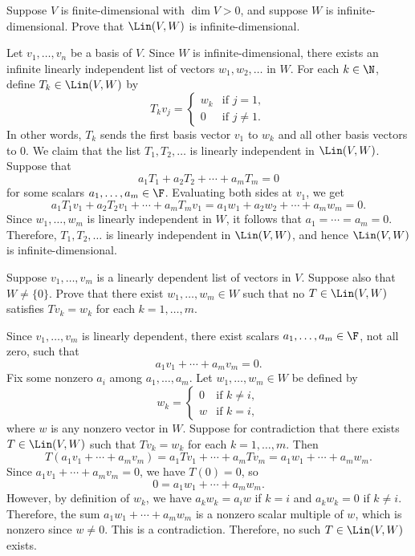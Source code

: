 \begin{exc}
\begin{exercise}
Suppose $V$ is finite-dimensional with $\dim V>0$, and suppose $W$ is
infinite-dimensional. Prove that $\Lin(V,W)$ is infinite-dimensional.
\end{exercise}
\begin{solution}
Let $v_1,\dots,v_n$ be a basis of $V$. Since $W$ is infinite-dimensional,
there exists an infinite linearly independent list of vectors
$w_1,w_2,\dots$ in $W$. For each $k\in\N$, define $T_k\in\Lin(V,W)$ by
\[ T_kv_j=\begin{cases} w_k & \text{if } j=1,\\
   0 & \text{if } j\ne1. \end{cases} \]
In other words, $T_k$ sends the first basis vector $v_1$ to $w_k$ and all
other basis vectors to $0$. We claim that the list $T_1,T_2,\dots$ is linearly
independent in $\Lin(V,W)$. Suppose that
\[ a_1T_1+a_2T_2+\cdots+a_mT_m=0 \]
for some scalars $a_1,\dots,a_m\in\F$. Evaluating both sides at $v_1$, we get
\[ a_1T_1v_1+a_2T_2v_1+\cdots+a_mT_mv_1=a_1w_1+a_2w_2+\cdots+a_mw_m=0. \]
Since $w_1,\dots,w_m$ is linearly independent in $W$, it follows that
$a_1=\cdots=a_m=0$. Therefore, $T_1,T_2,\dots$ is linearly independent in
$\Lin(V,W)$, and hence $\Lin(V,W)$ is infinite-dimensional.
\end{solution}

\begin{exercise}
Suppose $v_1,\dots,v_m$ is a linearly dependent list of vectors in $V$.
Suppose also that $W\ne\{0\}$. Prove that there exist $w_1,\dots,w_m\in W$
such that no $T\in\Lin(V,W)$ satisfies $Tv_k=w_k$ for each $k=1,\dots,m$.
\end{exercise}
\begin{solution}
Since $v_1,\dots,v_m$ is linearly dependent, there exist scalars
$a_1,\dots,\allowbreak a_m\in\F$, not all zero, such that
\[ a_1v_1+\cdots+a_mv_m=0. \]
Fix some nonzero $a_i$ among $a_1,\dots,a_m$. Let $w_1,\dots,w_m\in W$ be
defined by
\[ w_k=\begin{cases} 0 & \text{if } k\ne i,\\
   w & \text{if } k=i, \end{cases} \]
where $w$ is any nonzero vector in $W$. Suppose for contradiction that there
exists $T\in\Lin(V,W)$ such that $Tv_k=w_k$ for each $k=1,\dots,m$. Then
\[ T(a_1v_1+\cdots+a_mv_m)=a_1Tv_1+\cdots+a_mTv_m=a_1w_1+\cdots+a_mw_m. \]
Since $a_1v_1+\cdots+a_mv_m=0$, we have $T(0)=0$, so
\[ 0=a_1w_1+\cdots+a_mw_m. \]
However, by definition of $w_k$, we have $a_kw_k=a_iw$ if $k=i$ and
$a_kw_k=0$ if $k\ne i$. Therefore, the sum $a_1w_1+\cdots+a_mw_m$ is a
nonzero scalar multiple of $w$, which is nonzero since $w\ne0$. This is a
contradiction. Therefore, no such $T\in\Lin(V,W)$ exists.
\end{solution}


\end{exc}
